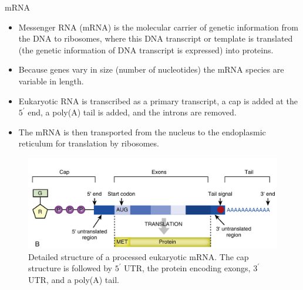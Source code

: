 \documentclass[11pt,ignorenonframetext,aspectratio=169]{beamer}
\providecommand{\tightlist}{%
  \setlength{\itemsep}{0pt}\setlength{\parskip}{0pt}}
\begin{document}
\begin{frame}{mRNA}
\protect\hypertarget{mrna}{}
\begin{itemize}
\tightlist
\item
  Messenger RNA (mRNA) is the molecular carrier of genetic information
  from the DNA to ribosomes, where this DNA transcript or template is
  translated (the genetic information of DNA transcript is expressed)
  into proteins.
\item
  Because genes vary in size (number of nucleotides) the mRNA species
  are variable in length.
\item
  Eukaryotic RNA is transcribed as a primary transcript, a cap is added
  at the \(5^\prime\) end, a poly(A) tail is added, and the introns are
  removed.
\item
  The mRNA is then transported from the nucleus to the endoplasmic
  reticulum for translation by ribosomes.
\end{itemize}
\end{frame}

\begin{frame}{}
\protect\hypertarget{section-9}{}
\begin{figure}
\includegraphics[width=0.7\linewidth]{../images/mrna_processed} \caption{Detailed structure of a processed eukaryotic mRNA. The cap structure is followed by $5^\prime$ UTR, the protein encoding exongs, $3^\prime$ UTR, and a poly(A) tail.}\label{fig:mrna-processed}
\end{figure}
\end{frame}
\end{document}
